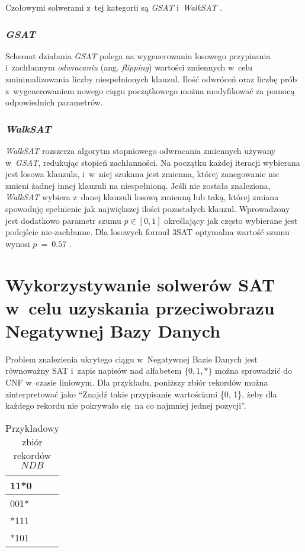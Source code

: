 Czołowymi solwerami z~tej kategorii są \textit{GSAT} i~\textit{WalkSAT} \cite{handbook-satifiability-incomplete}.


\subsubsection{\textit{GSAT}}
Schemat działania \textit{GSAT} polega na wygenerowaniu losowego przypisania i~zachłannym \textit{odwracaniu} (ang. \textit{flipping})
wartości zmiennych w~celu zminimalizowania liczby niespełnionych klauzul. Ilość odwróceń oraz liczbę prób
z~wygenerowaniem nowego ciągu początkowego można modyfikować za pomocą odpowiednich parametrów.

\subsubsection{\textit{WalkSAT}}
\textit{WalkSAT} rozszerza algorytm stopniowego odwracania zmiennych używany w~\textit{GSAT}, redukując stopień zachłanności.
Na początku każdej iteracji wybierana jest losowa klauzula, i~w~niej szukana jest zmienna, której zanegowanie nie zmieni żadnej
innej klauzuli na niespełnioną. Jeśli nie została znaleziona, \textit{WalkSAT} wybiera z~danej klauzuli losową zmienną lub taką, której
zmiana spowoduję spełnienie jak największej ilości pozostałych klauzul. Wprowadzony jest dodatkowo parametr szumu $p \in [0, 1]$ określający
jak często wybierane jest podejście nie-zachłanne. Dla losowych formuł 3SAT optymalna wartość szumu wynosi $p~=~0.57$ \cite{handbook-satifiability-incomplete}.



\section{Wykorzystywanie solwerów SAT w~celu uzyskania przeciwobrazu Negatywnej Bazy Danych}

Problem znalezienia ukrytego ciągu w~Negatywnej Bazie Danych jest równoważny SAT i~zapis napisów nad alfabetem 
$\{0, 1, *\}$ można sprowadzić do CNF w~czasie liniowym.
 Dla przykładu, poniższy zbiór rekordów można zinterpretować jako 
 \enquote{Znajdź takie przypisanie wartościami \{0, 1\}, żeby dla każdego rekordu nie pokrywało się na co najmniej jednej pozycji}.
 
\begin{table}[h]

    \centering
    \label{Tbl:NDB-sat-example}
    \begin{tabular}{|l|}
    	\hline
    	11*0 \\ \hline
    	001* \\ \hline
    	*111 \\ \hline
    	*101 \\ \hline
    \end{tabular}
    \caption{Przykładowy zbiór rekordów $NDB$}
\end{table}

